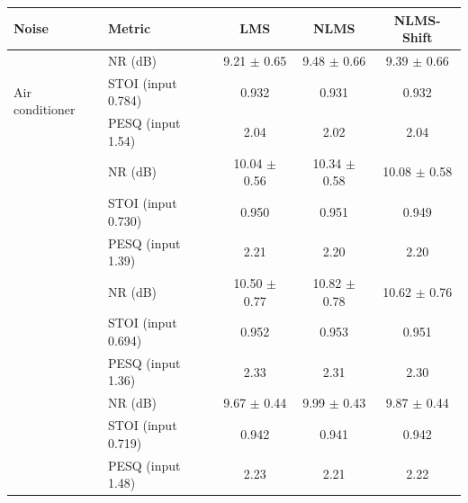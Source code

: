 \begin{tabular}{llccc}\toprule
Noise & Metric & LMS & NLMS & NLMS-Shift\\\midrule
\multirow{3}{*}{Air conditioner} & NR (dB) & 9.21 $\pm$ 0.65 & 9.48 $\pm$ 0.66 & 9.39 $\pm$ 0.66\\
 & STOI (input 0.784) & 0.932 & 0.931 & 0.932\\
 & PESQ (input 1.54) & 2.04 & 2.02 & 2.04\\\addlinespace
\multirow{3}{*}{Vacuum cleaner} & NR (dB) & 10.04 $\pm$ 0.56 & 10.34 $\pm$ 0.58 & 10.08 $\pm$ 0.58\\
 & STOI (input 0.730) & 0.950 & 0.951 & 0.949\\
 & PESQ (input 1.39) & 2.21 & 2.20 & 2.20\\\addlinespace
\multirow{3}{*}{Copy machine} & NR (dB) & 10.50 $\pm$ 0.77 & 10.82 $\pm$ 0.78 & 10.62 $\pm$ 0.76\\
 & STOI (input 0.694) & 0.952 & 0.953 & 0.951\\
 & PESQ (input 1.36) & 2.33 & 2.31 & 2.30\\\addlinespace
\multirow{3}{*}{Babble} & NR (dB) & 9.67 $\pm$ 0.44 & 9.99 $\pm$ 0.43 & 9.87 $\pm$ 0.44\\
 & STOI (input 0.719) & 0.942 & 0.941 & 0.942\\
 & PESQ (input 1.48) & 2.23 & 2.21 & 2.22\\
\bottomrule\end{tabular}
